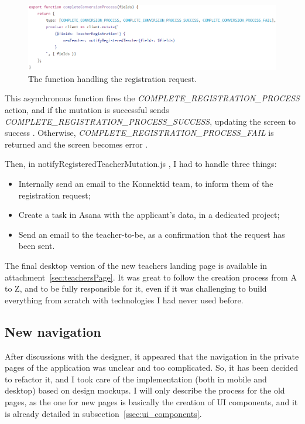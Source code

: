  \begin{figure}[H]
    \centering
    \includegraphics[scale=0.8]{figure/completeRegistration.png}
    \caption{The function handling the registration request.}
    \label{fig:completeRegistration}
\end{figure}

This asynchronous function fires the \textit{COMPLETE\_REGISTRATION\_PROCESS} action, and if the mutation is successful sends \textit{COMPLETE\_REGISTRATION\_PROCESS\_SUCCESS}, updating the screen to \guillemotleft{} success \guillemotright{}. Otherwise, \textit{COMPLETE\_REGISTRATION\_PROCESS\_FAIL} is returned and the screen becomes \guillemotleft{} error \guillemotright{}.

Then, in \guillemotleft{} notifyRegisteredTeacherMutation.js \guillemotright{}, I had to handle three things: 
\begin{itemize}[noitemsep]
    \item Internally send an email to the Konnektid team, to inform them of the registration request;
    \item Create a task in Asana with the applicant's data, in a dedicated project;
    \item Send an email to the teacher-to-be, as a confirmation that the request has been sent.
\end{itemize}

The final desktop version of the new teachers landing page is available in {\sc attachment}~\ref{sec:teachersPage}. It was great to follow the creation process from A to Z, and to be fully responsible for it, even if it was challenging to build everything from scratch with technologies I had never used before.

\subsection{New navigation}
\label{ssec:new_nav}

After discussions with the designer, it appeared that the navigation in the private pages of the application was unclear and too complicated. So, it has been decided to refactor it, and I took care of the implementation (both in mobile and desktop) based on design mockups. I will only describe the process for the old pages, as the one for new pages is basically the creation of UI components, and it is already detailed in {\sc subsection}~\ref{ssec:ui_components}.

